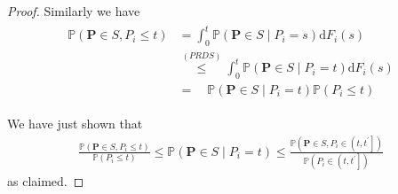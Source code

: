 \begin{proof}
Similarly we have
\begin{align*}
\begin{aligned}
\mathbb{P}\left(\boldsymbol{P} \in S, P_i \leq t\right) & =\int_0^t \mathbb{P}\left(\boldsymbol{P} \in S \mid P_i=s\right) \mathrm{d} F_i(s) \\
& \stackrel{(P R D S)}{\leq} \int_0^t \mathbb{P}\left(\boldsymbol{P} \in S \mid P_i=t\right) \mathrm{d} F_i(s) \\
& =\quad \mathbb{P}\left(\boldsymbol{P} \in S \mid P_i=t\right) \mathbb{P}\left(P_i \leq t\right)
\end{aligned}
\end{align*}


We have just shown that
\begin{align*}
\frac{\mathbb{P}\left(\boldsymbol{P} \in S, P_i \leq t\right)}{\mathbb{P}\left(P_i \leq t\right)} \leq \mathbb{P}\left(\boldsymbol{P} \in S \mid P_i=t\right) \leq \frac{\mathbb{P}\left(\boldsymbol{P} \in S, P_i \in\left(t, t^{\prime}\right]\right)}{\mathbb{P}\left(P_i \in\left(t, t^{\prime}\right]\right)}
\end{align*}
as claimed.
\end{proof}

